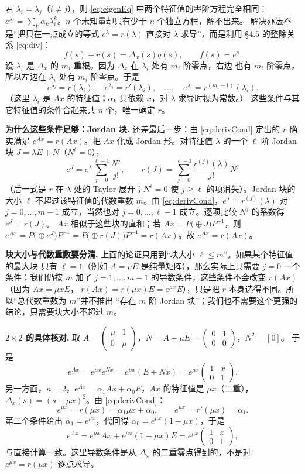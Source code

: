 \documentclass[11pt]{ctexart}
\newcommand{\pmat}[1]{\begin{pmatrix}#1\end{pmatrix}}
\newcommand{\zero}{[0]}
\newcommand{\Ax}{Ax}
\begin{document}

若 $\lambda_i=\lambda_j$（$i\ne j$），则 \eqref{eq:eigenEq} 中两个特征值的零阶方程完全相同：
$e^{\lambda_i}=\sum_k\alpha_k\lambda_i^k$。$n$ 个未知量却只有少于 $n$ 个独立方程，解不出来。
解决办法不是“把只在一点成立的等式 $e^\lambda=r(\lambda)$ 直接对 $\lambda$ 求导”，而是利用
§4.5 的整除关系 \eqref{eq:div}：
\[
f(s)-r(s)=\Delta_x(s)q(s),\qquad f(s)=e^s .
\]
设 $\lambda_i$ 是 $\Delta_x$ 的 $m_i$ 重根。因为 $\Delta_x$ 在 $\lambda_i$ 处有 $m_i$ 阶零点，右边
也有 $m_i$ 阶零点，所以左边在 $\lambda_i$ 处有 $m_i$ 阶零点。于是
\begin{equation}\label{eq:derivCond}
e^{\lambda_i}=r(\lambda_i),\quad
e^{\lambda_i}=r'(\lambda_i),\quad
\dots,\quad
e^{\lambda_i}=r^{(m_i-1)}(\lambda_i).
\end{equation}
（这里 $\lambda_i$ 是 $\Ax$ 的特征值；$\alpha_k$ 只依赖 $x$，对 $\lambda$ 求导时视为常数。）
这些条件与其它特征值的条件合起来共 $n$ 个，唯一确定 $r$。

\textbf{为什么这些条件足够：Jordan 块.} 还差最后一步：由 \eqref{eq:derivCond} 定出的 $r$ 确实满足
$e^{Ax}=r(\Ax)$。把 $\Ax$ 化成 Jordan 形。对特征值 $\lambda$ 的一个 $\ell$ 阶 Jordan 块
$J=\lambda E+N$（$N^\ell=0$），
\[
e^{J}=e^{\lambda}\sum_{j=0}^{\ell-1}\frac{N^j}{j!},
\qquad
r(J)=\sum_{j=0}^{\ell-1}\frac{r^{(j)}(\lambda)}{j!}N^j
\]
（后一式是 $r$ 在 $\lambda$ 处的 Taylor 展开；$N^\ell=0$ 使 $j\ge\ell$ 的项消失）。Jordan 块的大小
$\ell$ 不超过该特征值的代数重数 $m$。由 \eqref{eq:derivCond}，$e^{\lambda}=r^{(j)}(\lambda)$ 对
$j=0,\dots,m-1$ 成立，当然也对 $j=0,\dots,\ell-1$ 成立。逐项比较 $N^j$ 的系数得 $e^{J}=r(J)$。
$\Ax$ 相似于这些块的直和；若 $\Ax=P\bigl(\oplus J\bigr)P^{-1}$，则
$e^{Ax}=P\bigl(\oplus e^{J}\bigr)P^{-1}=P\bigl(\oplus r(J)\bigr)P^{-1}=r(\Ax)$。故
$e^{Ax}=r(\Ax)$。

\textbf{块大小与代数重数要分清.} 上面的论证只用到“块大小 $\ell\le m$”。如果某个特征值的最大块
只有 $\ell=1$（例如 $A=\mu E$ 是纯量矩阵），那么实际上只需要 $j=0$ 一个条件；我们仍按 $m$ 加了
$j=1,\dots,m-1$ 的导数条件，这些条件不会改变 $r(\Ax)$（因为 $\Ax=\mu xE$，
$r(\Ax)=r(\mu x)E=e^{\mu x}E$），只是把 $r$ 本身选得不同。所以“总代数重数为 $m$”并不推出
“存在 $m$ 阶 Jordan 块”；我们也不需要这个更强的结论，只需要块大小不超过 $m$。

\textbf{$2\times2$ 的具体核对.} 取 $A=\pmat{\mu&1\\0&\mu}$，$N=A-\mu E=\pmat{0&1\\0&0}$，$N^2=\zero$。
于是
\[
e^{Ax}=e^{\mu x}e^{Nx}=e^{\mu x}(E+Nx)=e^{\mu x}\pmat{1&x\\0&1}.
\]
另一方面，$n=2$，$e^{Ax}=\alpha_1\Ax+\alpha_0E$，$\Ax$ 的特征值是 $\mu x$（二重），
$\Delta_x(s)=(s-\mu x)^2$。由 \eqref{eq:derivCond}：
\[
e^{\mu x}=r(\mu x)=\alpha_1\mu x+\alpha_0,\qquad
e^{\mu x}=r'(\mu x)=\alpha_1 .
\]
第二个条件给出 $\alpha_1=e^{\mu x}$，代回得 $\alpha_0=e^{\mu x}(1-\mu x)$，于是
\[
e^{Ax}=e^{\mu x}\Ax+e^{\mu x}(1-\mu x)E
=e^{\mu x}\pmat{1&x\\0&1},
\]
与直接计算一致。这里导数条件是从 $\Delta_x$ 的二重零点得到的，不是对
$e^{\mu x}=r(\mu x)$ 逐点求导。
\end{document}

